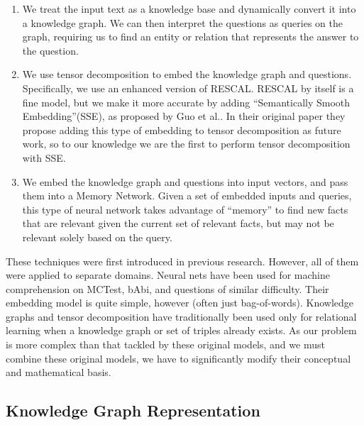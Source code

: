 \documentclass[pageno]{jpaper}
\begin{document}
\begin{enumerate}

    \item We treat the input text as a knowledge base and dynamically convert it
    into a knowledge graph. We can then interpret the questions as queries on
    the graph, requiring us to find an entity or relation that represents the
    answer to the question. \\

    \item We use tensor decomposition to embed the knowledge graph and
    questions. Specifically, we use an enhanced version of
    RESCAL\cite{Nickel2011}. RESCAL by itself is a fine model, but we make it
    more accurate by adding ``Semantically Smooth Embedding''(SSE), as proposed
    by Guo et al.\cite{Guo2015}. In their original paper they propose adding
    this type of embedding to tensor decomposition as future work, so to our
    knowledge we are the first to perform tensor decomposition with SSE. \\

    \item We embed the knowledge graph and questions into input vectors, and
    pass them into a Memory Network. Given a set of embedded inputs and queries,
    this type of neural network takes advantage of ``memory'' to find new facts
    that are relevant given the current set of relevant facts, but may not be
    relevant solely based on the query. \\

\end{enumerate}

These techniques were first introduced in previous research. However, all of
them were applied to separate domains. Neural nets have been used for machine
comprehension on MCTest, bAbi, and questions of similar difficulty. Their
embedding model is quite simple, however (often just bag-of-words). Knowledge
graphs and tensor decomposition have traditionally been used only for relational
learning when a knowledge graph or set of triples already exists. As our problem
is more complex than that tackled by these original models, and we must combine
these original models, we have to significantly modify their conceptual and
mathematical basis.

\subsection{Knowledge Graph Representation}
\label{Knowledge Graph Representation}
\end{document}
